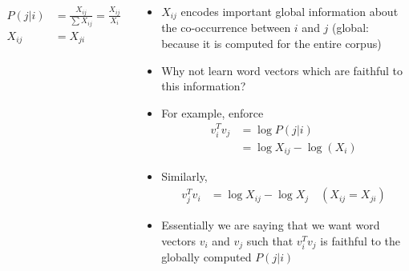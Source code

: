 \begin{frame}
\begin{columns}
\begin{overlayarea}{\textwidth}{\textheight}
			\footnotesize{
				\begin{align*}
					P(j|i) & = \frac{X_{ij}}{\sum X_{ij}} =\frac{X_{ij}}{X_{i}} \\
					X_{ij} & = X_{ji}
				\end{align*}
			}
		\end{overlayarea}
		\begin{overlayarea}{\textwidth}{\textheight}
			\footnotesize{
				\begin{itemize}
					\justifying
					\item<1-> $X_{ij}$ encodes important global information
					      about the co-occurrence between $i$ and $j$ (global: because it is computed for the entire corpus)
					\item<2-> Why not learn word vectors which are faithful
					      to this information?
					\item<3-> For example, enforce
					      \begin{align*}
						      v_{i}^{T}v_j & = \log P(j|i)             \\
						                   & = \log X_{ij} - \log(X_i)
					      \end{align*}
					\item<4-> Similarly,
					      \begin{align*}
						      v_{j}^{T}v_i & = \log X_{ij} - \log X_j \quad (X_{ij} = X_{ji})
					      \end{align*}
					\item<5-> Essentially we are saying that we want word vectors $v_i$ and $v_j$ such that $v_i^T v_j$ is faithful to the globally computed $P(j|i)$
				\end{itemize}
			}
		\end{overlayarea}
	\end{columns}
\end{frame}


